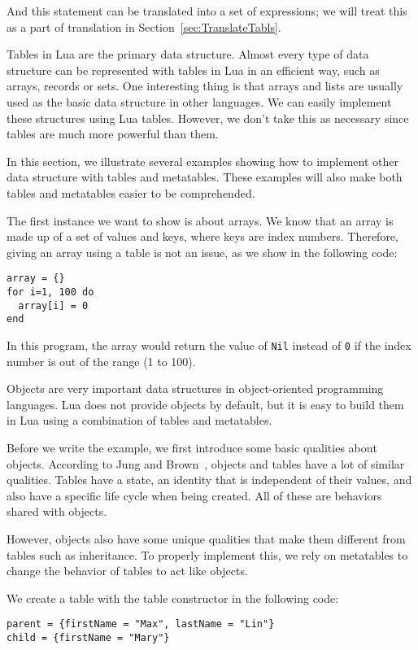 And this statement can be translated into a set of expressions; we will treat this as a part of translation in Section~\ref{sec:TranslateTabls}.

Tables in Lua are the primary data structure. Almost every type of data structure can be represented with tables in Lua in an efficient way, such as arrays, records or sets. One interesting thing is that arrays and lists are usually used as the basic data structure in other languages. We can easily implement these structures using Lua tables. However, we don't take this as necessary since tables are much more powerful than them.

In this section, we illustrate several examples showing how to implement other data structure with tables and metatables. These examples will also make both tables and metatables easier to be comprehended.

The first instance we want to show is about arrays. We know that an array is made up of a set of values and keys, where keys are index numbers. Therefore, giving an array using a table is not an issue, as we show in the following code:

\begin{verbatim}
array = {}
for i=1, 100 do
  array[i] = 0
end
\end{verbatim}

In this program, the array would return the value of {\tt Nil} instead of {\tt 0} if the index number is out of the range (1 to 100).

Objects are very important data structures in object-oriented programming languages. Lua does not provide objects by default, but it is easy to build them in Lua using a combination of tables and metatables.

Before we write the example, we first introduce some basic qualities about objects. According to Jung and Brown~\cite{begLua}, objects and tables have a lot of similar qualities. Tables have a state, an identity that is independent of their values, and also have a specific life cycle when being created. All of these are behaviors shared with objects.

However, objects also have some unique qualities that make them different from tables such as inheritance. To properly implement this, we rely on metatables to change the behavior of tables to act like objects.

We create a table with the table constructor in the following code:

\begin{verbatim}
parent = {firstName = "Max", lastName = "Lin"} 
child = {firstName = "Mary"} 
\end{verbatim}

